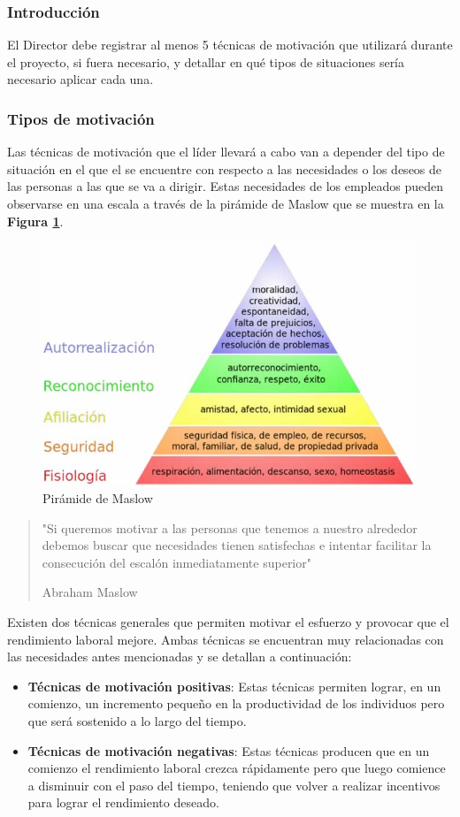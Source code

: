 \subsubsection{Introducción}

El Director debe registrar al menos 5 técnicas de motivación que utilizará durante el proyecto, si fuera necesario, y detallar en qué tipos de situaciones sería necesario aplicar cada una.

\subsubsection{Tipos de motivación}

Las técnicas de motivación que el líder llevará a cabo van a depender del tipo de situación en el que el se encuentre con respecto a las necesidades o los deseos de las  personas a las que se va  a dirigir. Estas necesidades de los empleados pueden observarse en una escala a través de la pirámide de Maslow que se muestra en la \textbf{Figura \ref{Maslow}}.
 \begin{figure}[h]
  \centering
  \includegraphics[width=.8\textwidth]{img/tp1_integrador/piramide_de_maslow}
  \caption{Pirámide de Maslow}
  \label{Maslow}
\end{figure}
\begin{quote}
\small "Si queremos motivar a las personas que tenemos a nuestro alrededor debemos buscar que necesidades tienen satisfechas e intentar facilitar la consecución del escalón inmediatamente superior" 

Abraham Maslow
\end{quote}
Existen dos técnicas generales que permiten motivar el esfuerzo y provocar que el rendimiento laboral mejore. Ambas técnicas se encuentran muy relacionadas con las necesidades antes mencionadas y se detallan a continuación:
\begin{itemize}
\item \textbf{Técnicas de motivación positivas}: 
Estas técnicas permiten lograr, en un comienzo, un incremento pequeño en la productividad de los individuos pero que será sostenido a lo largo del tiempo.
\item \textbf{Técnicas de motivación negativas}: 
Estas técnicas producen que en un comienzo el rendimiento laboral crezca rápidamente pero que luego comience a disminuir con el paso del tiempo, teniendo que volver a realizar incentivos para lograr el rendimiento deseado. 
\end{itemize}

